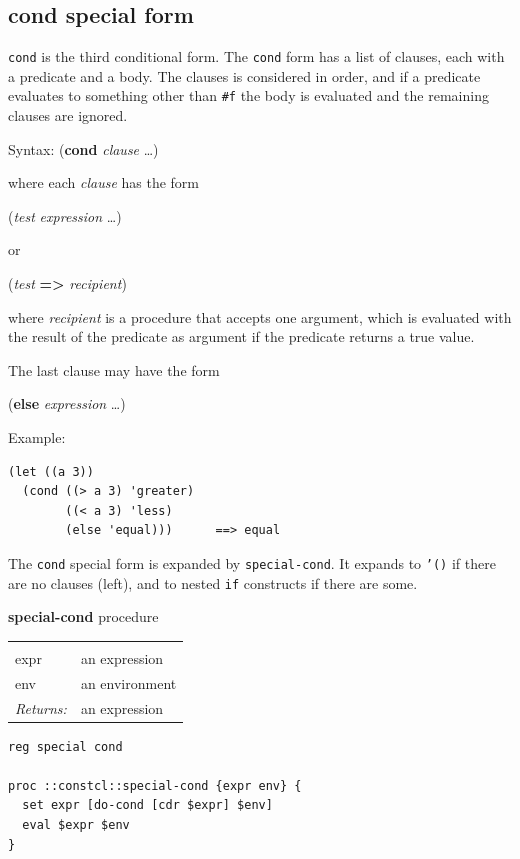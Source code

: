 \documentclass[a5paper,draft]{memoir}
\begin{document}
\subsection{cond special form}
\label{cond-special-form}

\texttt{cond} is the third conditional form. The \texttt{cond} form has a list of clauses, each with a predicate and a body. The clauses is considered in order, and if a predicate evaluates to something other than \texttt{\#f} the body is evaluated and the remaining clauses are ignored.

Syntax: (\textbf{cond} \emph{clause} \ldots )

where each \emph{clause} has the form

(\emph{test} \emph{expression} \ldots )

or

(\emph{test} \textbf{=>} \emph{recipient})

where \emph{recipient} is a procedure that accepts one argument, which is evaluated with the result of the predicate as argument if the predicate returns a true value.

The last clause may have the form

(\textbf{else} \emph{expression} \ldots )

Example:

\begin{verbatim}
(let ((a 3))
  (cond ((> a 3) 'greater)
        ((< a 3) 'less)
        (else 'equal)))      ==> equal
\end{verbatim}

The \texttt{cond} special form is expanded by \texttt{special-cond}. It expands to \texttt{'()} if there are no clauses (left), and to nested \texttt{if} constructs if there are some.

\textbf{special-cond} procedure

\noindent\begin{tabular}{ |p{1.9cm} p{6.5cm}| }
\hline
\rowcolor[HTML]{CCCCCC} \multicolumn{2}{|l|}{\textbf{special-cond (internal)}} \\
expr & an expression \\
env & an environment \\
\textit{Returns:} & an expression \\
\hline
\end{tabular}

\begin{lstlisting}
reg special cond

proc ::constcl::special-cond {expr env} {
  set expr [do-cond [cdr $expr] $env]
  eval $expr $env
}
\end{lstlisting}
\end{document}
